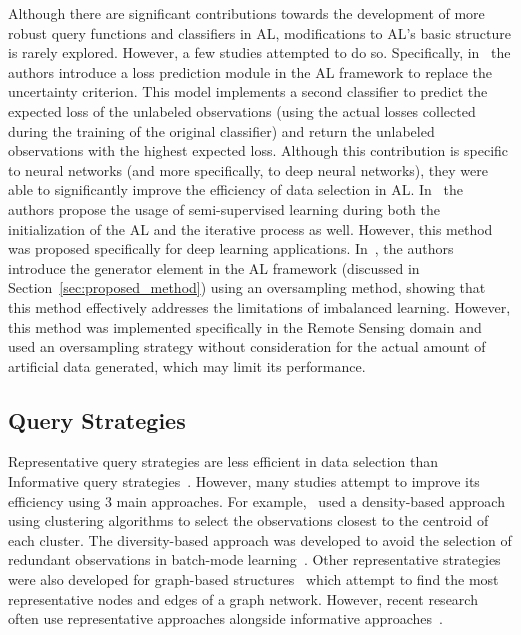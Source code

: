 \documentclass[parskip=full]{scrartcl}
\begin{document}
Although there are significant contributions towards the development of more
robust query functions and classifiers in AL, modifications to AL's basic
structure is rarely explored. However, a few studies attempted to do so.
Specifically, in~\cite{Yoo2019} the authors introduce a loss prediction module
in the AL framework to replace the uncertainty criterion. This model
implements a second classifier to predict the expected loss of the unlabeled
observations (using the actual losses collected during the training of the
original classifier) and return the unlabeled observations with the highest
expected loss. Although this contribution is specific to neural networks (and
more specifically, to deep neural networks), they were able to significantly
improve the efficiency of data selection in AL\@. In~\cite{Simeoni2020} the
authors propose the usage of semi-supervised learning during both the
initialization of the AL and the iterative process as well. However, this
method was proposed specifically for deep learning applications.
In~\cite{Fonseca2021}, the authors introduce the generator element in the AL
framework (discussed in Section~\ref{sec:proposed_method}) using an
oversampling method, showing that this method effectively addresses the
limitations of imbalanced learning.  However, this method was implemented
specifically in the Remote Sensing domain and used an oversampling strategy
without consideration for the actual amount of artificial data generated,
which may limit its performance.

\subsection{Query Strategies}

Representative query strategies are less efficient in data selection than
Informative query strategies~\cite{Kumar2020}. However, many studies attempt
to improve its efficiency using 3 main approaches. For
example,~\cite{Huang2014, Li2012, Ienco2013} used a density-based approach
using clustering algorithms to select the observations closest to the centroid
of each cluster. The diversity-based approach was developed to avoid the
selection of redundant observations in batch-mode learning~\cite{Brinker2003}.
Other representative strategies were also developed for graph-based
structures~\cite{Jia2019} which attempt to find the most representative nodes
and edges of a graph network. However, recent research often use
representative approaches alongside informative approaches~\cite{Gu2021,
Samat2016}. 
\end{document}
